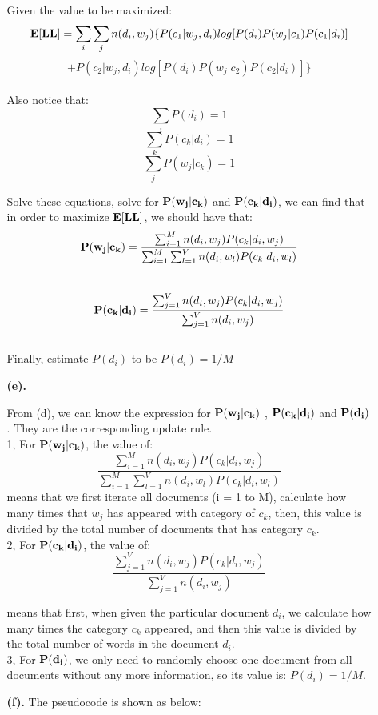 \begin{enumerate}
\begin{enumerate}
Given the value to be maximized:
$${\bf E[LL]} = \sum_i \sum_j n(d_i, w_j)\{ P(c_1|w_j, d_i)log[P(d_i) P(w_j|c_1)P(c_1|d_i)] $$
$$ + P(c_2|w_j, d_i)log[P(d_i) P(w_j|c_2)P(c_2|d_i)] \}$$\\

Also notice that:
$$\sum_i P(d_i) = 1$$
$$\sum_k P(c_k|d_i) = 1$$
$$\sum_j P(w_j|c_k) = 1$$

Solve these equations, solve for $\bf P(w_j|c_k)$ and $\bf P(c_k|d_i)$,  we can find that in order to maximize ${\bf E[LL]}$, we should have that:\\

$${\bf P(w_j|c_k)} = \frac{\sum_{i=1}^M n(d_i, w_j)P(c_k|d_i, w_j)}{\sum_{i=1}^M\sum_{l=1}^V n(d_i, w_l)P(c_k|d_i, w_l)}$$\\

$${\bf P(c_k|d_i)} = \frac{\sum_{j=1}^V n(d_i, w_j)P(c_k|d_i, w_j)}
{\sum_{j=1}^V n(d_i, w_j)}$$\\

Finally, estimate $P(d_i)$ to be $P(d_i) = 1/M$\\

\item[\bf (e). ]

From (d), we can know the expression for $\bf P(w_j|c_k)$ , $\bf P(c_k|d_i)$ and 
$\bf P(d_i)$. They are the corresponding update rule. \\

1, For $\bf P(w_j|c_k)$, the value of:
$$\frac{\sum_{i=1}^M n(d_i, w_j)P(c_k|d_i, w_j)}{\sum_{i=1}^M\sum_{l=1}^V n(d_i, w_l)P(c_k|d_i, w_l)}$$
 means that we first iterate all documents (i = 1 to M), calculate how many times that $w_j$ has appeared with category of $c_k$, then, this value is divided by the total number of documents that has category $c_k$.\\

2, For $\bf P(c_k|d_i)$, the value of:
$$\frac{\sum_{j=1}^V n(d_i, w_j)P(c_k|d_i, w_j)}
{\sum_{j=1}^V n(d_i, w_j)}$$

means that first, when given the particular document $d_i$, we calculate how many times the category $c_k$ appeared, and then this value is divided by the total number of words in the document $d_i$.\\

3, For $\bf P(d_i)$, we only need to randomly choose one document from all documents without any more information, so its value is: $P(d_i) = 1/M$.\\

 
\item[\bf (f). ] The pseudocode is shown as below:\\


\end{enumerate}
\end{enumerate}
